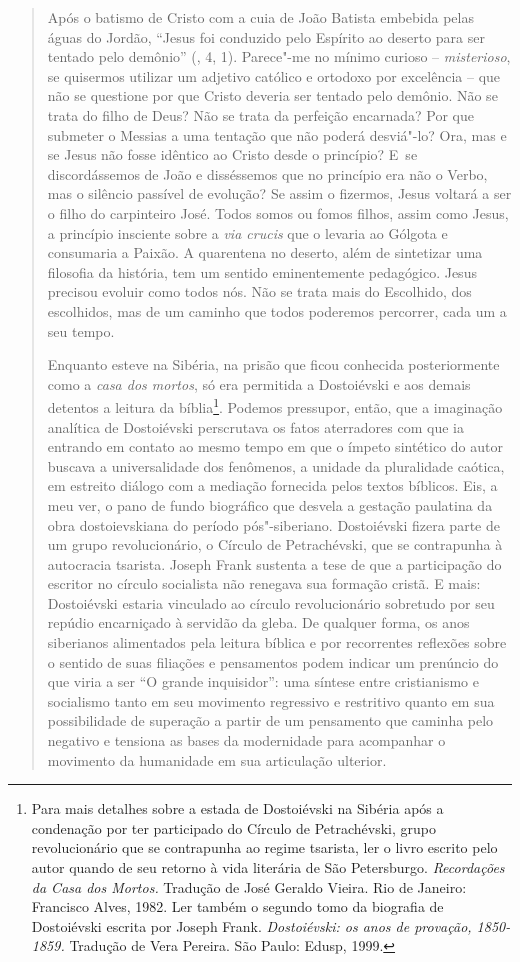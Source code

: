 {\begin{quote}
Após o batismo de Cristo com a cuia de João Batista embebida pelas águas
do Jordão, ``Jesus foi conduzido pelo Espírito ao deserto para ser
tentado pelo demônio'' (, 4, 1). Parece"-me no mínimo curioso --
\emph{misterioso}, se quisermos utilizar um adjetivo católico e ortodoxo
por excelência -- que não se questione por que Cristo deveria ser
tentado pelo demônio. Não se trata do filho de Deus? Não se trata da
perfeição encarnada? Por que submeter o Messias a uma tentação que não
poderá desviá"-lo? Ora, mas e se Jesus não fosse idêntico ao Cristo desde
o princípio? E~se discordássemos de João e disséssemos que no princípio
era não o Verbo, mas o silêncio passível de evolução? Se assim o
fizermos, Jesus voltará a ser o filho do carpinteiro José. Todos somos
ou fomos filhos, assim como Jesus, a princípio insciente sobre a
\emph{via crucis} que o levaria ao Gólgota e consumaria a Paixão. A
quarentena no deserto, além de sintetizar uma filosofia da história, tem
um sentido eminentemente pedagógico. Jesus precisou evoluir como todos
nós. Não se trata mais do Escolhido, dos escolhidos, mas de um caminho
que todos poderemos percorrer, cada um a seu tempo.

Enquanto esteve na Sibéria, na prisão que ficou conhecida posteriormente
como a \emph{casa dos mortos}, só era permitida a Dostoiévski e aos
demais detentos a leitura da bíblia\footnote{Para mais detalhes sobre a
  estada de Dostoiévski na Sibéria após a condenação por ter participado
  do Círculo de Petrachévski, grupo revolucionário que se contrapunha ao
  regime tsarista, ler o livro escrito pelo autor quando de seu retorno
  à vida literária de São Petersburgo. \emph{Recordações da Casa dos
  Mortos.} Tradução de José Geraldo Vieira. Rio de Janeiro: Francisco
  Alves, 1982. Ler também o segundo tomo da biografia de Dostoiévski
  escrita por Joseph Frank. \emph{Dostoiévski: os anos de provação,
  1850-1859.} Tradução de Vera Pereira. São Paulo: Edusp, 1999.}.
Podemos pressupor, então, que a imaginação analítica de Dostoiévski
perscrutava os fatos aterradores com que ia entrando em contato ao mesmo
tempo em que o ímpeto sintético do autor buscava a universalidade dos
fenômenos, a unidade da pluralidade caótica, em estreito diálogo com a
mediação fornecida pelos textos bíblicos. Eis, a meu ver, o pano de
fundo biográfico que desvela a gestação paulatina da obra dostoievskiana
do período pós"-siberiano. Dostoiévski fizera parte de um grupo
revolucionário, o Círculo de Petrachévski, que se contrapunha à
autocracia tsarista. Joseph Frank sustenta a tese de que a participação
do escritor no círculo socialista não renegava sua formação cristã. E
mais: Dostoiévski estaria vinculado ao círculo revolucionário sobretudo
por seu repúdio encarniçado à servidão da gleba. De qualquer forma, os
anos siberianos alimentados pela leitura bíblica e por recorrentes
reflexões sobre o sentido de suas filiações e pensamentos podem indicar
um prenúncio do que viria a ser ``O grande inquisidor'': uma síntese
entre cristianismo e socialismo tanto em seu movimento regressivo e
restritivo quanto em sua possibilidade de superação a partir de um
pensamento que caminha pelo negativo e tensiona as bases da modernidade
para acompanhar o movimento da humanidade em sua articulação ulterior.


\end{quote}}
